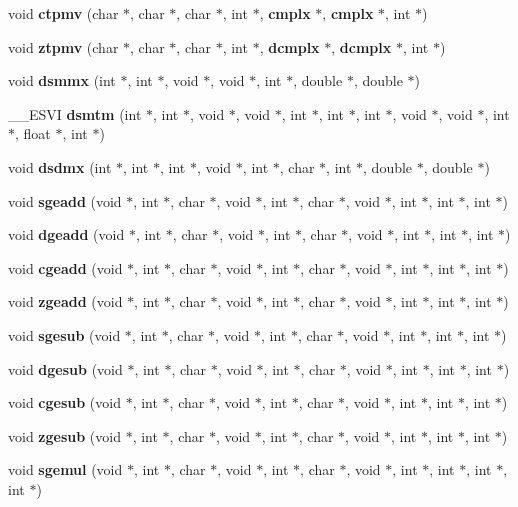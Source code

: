 \begin{CompactItemize}
\item 
void {\bf ctpmv} (char $\ast$, char $\ast$, char $\ast$, int $\ast$, {\bf cmplx} $\ast$, {\bf cmplx} $\ast$, int $\ast$)
\item 
void {\bf ztpmv} (char $\ast$, char $\ast$, char $\ast$, int $\ast$, {\bf dcmplx} $\ast$, {\bf dcmplx} $\ast$, int $\ast$)
\item 
void {\bf dsmmx} (int $\ast$, int $\ast$, void $\ast$, void $\ast$, int $\ast$, double $\ast$, double $\ast$)
\item 
\_\-\_\-ESVI {\bf dsmtm} (int $\ast$, int $\ast$, void $\ast$, void $\ast$, int $\ast$, int $\ast$, int $\ast$, void $\ast$, void $\ast$, int $\ast$, float $\ast$, int $\ast$)
\item 
void {\bf dsdmx} (int $\ast$, int $\ast$, int $\ast$, void $\ast$, int $\ast$, char $\ast$, int $\ast$, double $\ast$, double $\ast$)
\item 
void {\bf sgeadd} (void $\ast$, int $\ast$, char $\ast$, void $\ast$, int $\ast$, char $\ast$, void $\ast$, int $\ast$, int $\ast$, int $\ast$)
\item 
void {\bf dgeadd} (void $\ast$, int $\ast$, char $\ast$, void $\ast$, int $\ast$, char $\ast$, void $\ast$, int $\ast$, int $\ast$, int $\ast$)
\item 
void {\bf cgeadd} (void $\ast$, int $\ast$, char $\ast$, void $\ast$, int $\ast$, char $\ast$, void $\ast$, int $\ast$, int $\ast$, int $\ast$)
\item 
void {\bf zgeadd} (void $\ast$, int $\ast$, char $\ast$, void $\ast$, int $\ast$, char $\ast$, void $\ast$, int $\ast$, int $\ast$, int $\ast$)
\item 
void {\bf sgesub} (void $\ast$, int $\ast$, char $\ast$, void $\ast$, int $\ast$, char $\ast$, void $\ast$, int $\ast$, int $\ast$, int $\ast$)
\item 
void {\bf dgesub} (void $\ast$, int $\ast$, char $\ast$, void $\ast$, int $\ast$, char $\ast$, void $\ast$, int $\ast$, int $\ast$, int $\ast$)
\item 
void {\bf cgesub} (void $\ast$, int $\ast$, char $\ast$, void $\ast$, int $\ast$, char $\ast$, void $\ast$, int $\ast$, int $\ast$, int $\ast$)
\item 
void {\bf zgesub} (void $\ast$, int $\ast$, char $\ast$, void $\ast$, int $\ast$, char $\ast$, void $\ast$, int $\ast$, int $\ast$, int $\ast$)
\item 
void {\bf sgemul} (void $\ast$, int $\ast$, char $\ast$, void $\ast$, int $\ast$, char $\ast$, void $\ast$, int $\ast$, int $\ast$, int $\ast$, int $\ast$)

\end{CompactItemize}
